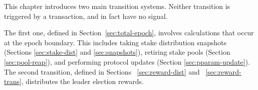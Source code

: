 \newcommand{\UTxOEpState}{\type{UTxOEpState}}
\newcommand{\Acnt}{\type{Acnt}}
\newcommand{\RewardEnv}{\type{RewardEnv}}
\newcommand{\RewardState}{\type{RewardState}}
\newcommand{\PlReapState}{\type{PlReapState}}
\newcommand{\NewPParamEnv}{\type{NewPParamEnv}}
\newcommand{\Snapshots}{\type{Snapshots}}
\newcommand{\SnapshotEnv}{\type{SnapshotEnv}}
\newcommand{\SnapshotState}{\type{SnapshotState}}
\newcommand{\NewPParamState}{\type{NewPParamState}}
\newcommand{\EpochEnv}{\type{EpochEnv}}
\newcommand{\EpochState}{\type{EpochState}}
\newcommand{\BlocksMade}{\type{BlocksMade}}
\newcommand{\Stake}{\type{Stake}}
\newcommand{\PooledStake}{\type{PooledStake}}
\newcommand{\Avgs}{\type{Avgs}}

\newcommand{\obligation}[4]{\fun{obligation}~ \var{#1}~ \var{#2}~ \var{#3}~ \var{#4}}
\newcommand{\reward}[7]{\fun{reward}
  ~ \var{#1}~ \var{#2}~ \var{#3}~ \var{#4}~ \var{#5}~ \var{#6}~ \var{#7}}
\newcommand{\rewardOnePool}[9]{\fun{rewardOnePool}
  ~\var{#1}~\var{#2}~\var{#3}~\var{#4}~\var{#5}~\var{#6}~\var{#7}~\var{#8}~\var{#9}}
\newcommand{\isActive}[4]{\fun{isActive}~ \var{#1}~ \var{#2}~ \var{#3}~ \var{#4}}
\newcommand{\activeStake}[5]{\fun{activeStake}~ \var{#1}~ \var{#2}~ \var{#3}~ \var{#4}~ \var{#5}}
\newcommand{\poolRefunds}[3]{\fun{poolRefunds}~ \var{#1}~ \var{#2}~ \var{#3}}
\newcommand{\poolStake}[4]{\fun{poolStake}~ \var{#1}~ \var{#2}~ \var{#3}~ \var{#4}}
\newcommand{\poolDistr}[3]{\fun{poolDistr}~ \var{#1}~ \var{#2}~ \var{#3}}
\newcommand{\lReward}[4]{\fun{r_{leader}}~ \var{#1}~ \var{#2}~ \var{#3}~ {#4}}
\newcommand{\mReward}[4]{\fun{r_{member}}~ \var{#1}~ \var{#2}~ \var{#3}~ {#4}}
\newcommand{\poolReward}[6]{\fun{poolReward}~\var{#1}~\var{#2}~\var{#3}~\var{#4}~\var{#5}~\var{#6}}
\newcommand{\movingAvg}[5]{\fun{movingAvg}~ \var{#1}~ \var{#2}~ \var{#3}~ \var{#4}~ \var{#5}}
\newcommand{\updateAvgs}[4]{\fun{updateAvgs}~ \var{#1}~ \var{#2}~ \var{#3}~ \var{#4}}

This chapter introduces two main transition systems.
Neither transition is triggered by a transaction, and in fact have no signal.

The first one, defined in Section~\ref{sec:total-epoch},
involves calculations that occur at the epoch boundary.
This includes taking stake distribution snapshots
(Sections \ref{sec:stake-dist} and \ref{sec:snapshots}),
retiring stake pools (Section \ref{sec:pool-reap}),
and performing protocol updates (Section \ref{sec:pparam-update}).
The second transition, defined in Sections ~\ref{sec:reward-dist} and ~\ref{sec:reward-trans},
distributes the leader election rewards.

